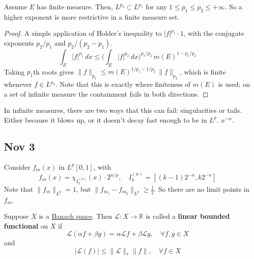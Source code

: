  \begin{corollary}
    \label{thm:nesting-of-lp-spaces-on-a-finite-measure-space}
    Assume $E$ has finite measure. Then, $L^{p_2} \subset L^{p_1}$ for any $1 \leq p_1 \leq p_2 \leq +\infty$. So a higher exponent is more restrictive in a finite measure set. 
  \end{corollary}
  \begin{proof}
    A simple application of Holder's inequality to $|f|^{p_1} \cdot 1$, with the conjugate exponents $p_2 / p_1$ and $p_2 / (p_2 - p_1)$. 
    \begin{equation}
      \int_E |f|^{p_1} \,dx \leq \bigg( \int_E |f|^{p_2} \,dx \bigg)^{p_1/p_2} \, m(E)^{1 - p_1/p_2}
    \end{equation}
    Taking $p_1$th roots gives $\|f\|_{p_1} \leq m(E)^{1/p_1 - 1/p_2} \, \|f\|_{p_2}$, which is finite whenever $f \in L^{p_2}$. Note that this is exactly where finiteness of $m(E)$ is used; on a set of infinite measure the containment fails in both directions. 
  \end{proof}

  In infinite measures, there are two ways that this can fail: singularities or tails. Either because it blows up, or it doesn't decay fast enough to be in $L^p$. $x^{-\alpha}$. 

\subsection{Nov 3} 

  \begin{example}
    \label{ex:a-sequence-with-no-lp-limit-point}
    Consider $f_m (x)$ in $L^p [0, 1]$, with 
    \begin{equation}
      f_m (x) =  \chi_{I_k^{(n)}} (x) \cdot 2^{n/p}, \quad I_k^{(n)} = [ (k-1) 2^{-n}, k 2^{-n}] 
    \end{equation}
    Note that $\|f_m\|_{L^p} = 1$, but $\|f_{m_1} - f_{m_2}\|_{L^p} \geq \frac{1}{2}$. So there are no limit points in $f_m$. 
  \end{example}

  \begin{definition}
    \label{def:dual-vector}
    Suppose $X$ is a \hyperref[mv-def:banach-space]{Banach space}. Then $\mathcal{L}: X \to \mathbb{R}$ is called a \textbf{linear bounded functional} on $X$ if 
    \begin{equation}
      \mathcal{L}(\alpha f + \beta g)  = \alpha \mathcal{L} f + \beta \mathcal{L} g, \quad \forall f, g \in X
    \end{equation}
    and  
    \begin{equation}
      | \mathcal{L} (f)| \leq \|\mathcal{L}\|_\ast \|f\|, \quad \forall f \in X
    \end{equation}
  \end{definition}

